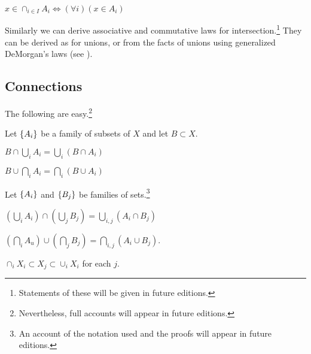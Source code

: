 \begin{proposition}
$x \in \cap _{i \in I} A_i \iff (\forall i)(x \in A_i)$
\end{proposition}

Similarly we can derive associative and commutative laws for intersection.\footnote{Statements of these will be given in future editions.}
They can be derived as for unions, or from the facts of unions using generalized DeMorgan's laws (see ).

\subsection*{Connections}

The following are easy.\footnote{Nevertheless, full accounts will appear in future editions.}

Let $\{A_i\}$ be a family of subsets of $X$ and let $B \subset X$.

\begin{proposition}
$B \cap \bigcup_{i} A_i = \bigcup_{i} (B \cap A_i)$
\end{proposition}

\begin{proposition}
$B \cup \bigcap_{i} A_i = \bigcap_{i} (B \cup A_i)$
\end{proposition}

Let $\{A_i\}$ and $\{B_j\}$ be families of sets.\footnote{An account of the notation used and the proofs will appear in future editions.}

\begin{proposition}
$(\bigcup_{i} A_i) \cap (\bigcup_{j} B_j) = \bigcup_{i,j}(A_i \cap B_j)$
\end{proposition}

\begin{proposition}
$(\bigcap_{i} A_u) \cup (\bigcap_{j} B_j) = \bigcap_{i,j}(A_i \cup B_j).$
\end{proposition}

\begin{proposition}
$\cap _i X_i \subset X_j \subset \cup_i X_i$ for each $j$.
\end{proposition}


